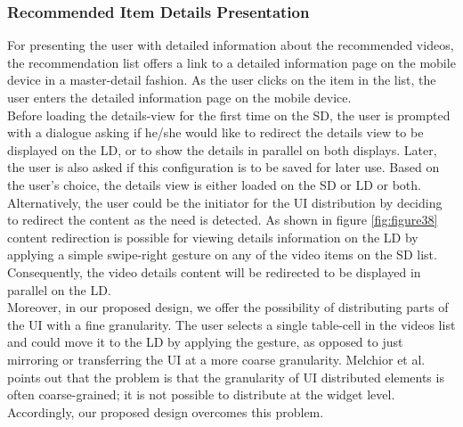 \subsubsection{Recommended Item Details Presentation}
For presenting the user with detailed information about the recommended videos, the recommendation list offers a link to a detailed information page on the mobile device in a master-detail fashion. As the user clicks on the item in the list, the user enters the detailed information page on the mobile device.\\
Before loading the details-view for the first time on the SD, the user is prompted with a dialogue asking if he/she would like to redirect the details view to be displayed on the LD, or to show the details in parallel on both displays. Later, the user is also asked if this configuration is to be saved for later use. Based on the user's choice, the details view is either loaded on the SD or LD or both.\\
Alternatively, the user could be the initiator for the UI distribution by
deciding to redirect the content as the need is detected. As shown in figure
\ref{fig:figure38} content redirection is possible for viewing details information on the LD by applying a simple swipe-right gesture on any of the video items on the SD list. Consequently, the video details content will be redirected to be displayed in parallel on the LD.\\ 
Moreover, in our proposed design, we offer the possibility of distributing parts
of the UI with a fine granularity. The user selects a single table-cell in the
videos list and could move it to the LD by applying the gesture, as opposed to
just mirroring or transferring the UI at a more coarse granularity.
Melchior et al. \cite{melchior2011distribution} points out that the problem is
that the granularity of UI distributed elements is often coarse-grained; it is
not possible to distribute at the widget level. Accordingly, our proposed design 
overcomes this problem.
